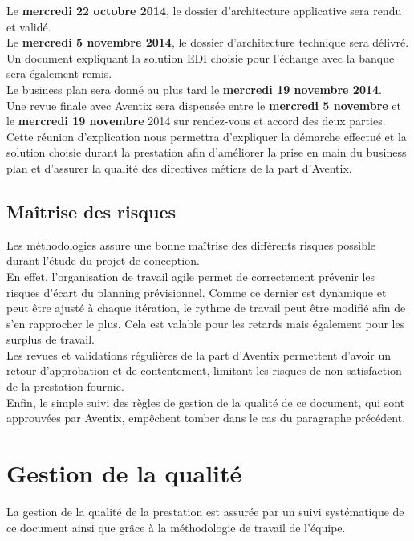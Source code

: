 Le \textbf{mercredi 22 octobre 2014}, le dossier d'architecture applicative sera rendu
et validé. \\

Le \textbf{mercredi 5 novembre 2014}, le dossier d'architecture technique sera délivré.
Un document expliquant la solution EDI choisie pour l'échange avec la banque
sera également remis. \\

Le business plan sera donné au plus tard le \textbf{mercredi 19 novembre 2014}. \\

Une revue finale avec Aventix sera dispensée entre le \textbf{mercredi 5
  novembre} et le \textbf{mercredi 19 novembre} 2014 sur rendez-vous et accord
des deux parties.  Cette réunion d'explication nous permettra d'expliquer la
démarche effectué et la solution choisie durant la prestation afin d'améliorer
la prise en main du business plan et d'assurer la qualité des directives
métiers de la part d'Aventix. \\

\subsection{Maîtrise des risques}
Les méthodologies assure une bonne maîtrise des différents risques possible
durant l'étude du projet de conception. \\

En effet, l'organisation de travail agile permet de correctement prévenir les
risques d'écart du planning prévisionnel. Comme ce dernier est dynamique et
peut être ajusté à chaque itération, le rythme de travail peut être modifié
afin de s'en rapprocher le plus. Cela est valable pour les retards mais
également pour les surplus de travail. \\

Les revues et validations régulières de la part d'Aventix permettent d'avoir un
retour d'approbation et de contentement, limitant les risques de non
satisfaction de la prestation fournie. \\

Enfin, le simple suivi des règles de gestion de la qualité de ce document, qui
sont approuvées par Aventix, empêchent tomber dans le cas du paragraphe
précédent. \\

\section{Gestion de la qualité}
La gestion de la qualité de la prestation est assurée par un suivi systématique
de ce document ainsi que grâce à la méthodologie de travail de l'équipe. \\

